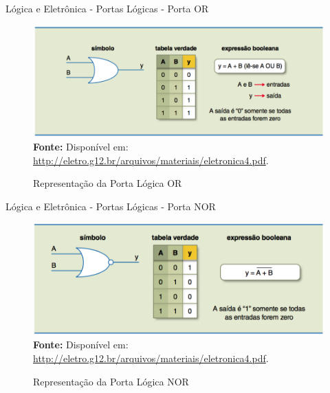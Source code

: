 \documentclass[aspectratio=169]{beamer}
\begin{document}
	\begin{frame}{Lógica e Eletrônica - Portas Lógicas - Porta OR}
		\begin{figure}[h]
			\centering
			\caption{Representação da Porta Lógica OR}
			\includegraphics[height=0.66\textheight]{img/ed/ed-porta_or.png}
			\\
			{\footnotesize \textbf{Fonte:} Disponível em: \url{http://eletro.g12.br/arquivos/materiais/eletronica4.pdf}.}
			\label{fig:ed-porta_OR}
		\end{figure}
	\end{frame}
	
	\begin{frame}{Lógica e Eletrônica - Portas Lógicas - Porta NOR}
		\begin{figure}[h]
			\centering
			\caption{Representação da Porta Lógica NOR}
			\includegraphics[height=0.66\textheight]{img/ed/ed-porta_nor.png}
			\\
			{\footnotesize \textbf{Fonte:} Disponível em: \url{http://eletro.g12.br/arquivos/materiais/eletronica4.pdf}.}
			\label{fig:ed-porta_NOR}
		\end{figure}
	\end{frame}
	
\end{document}
